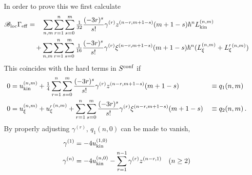 \documentclass[a4paper,12pt]{article}
\newcommand{\Bl}{{\mathscr B}_{\rm loc}}
\def\quar{{\textstyle \frac{1}{4}}}
\newcommand{\Geff}{\Gamma_{\rm eff}}
\newcommand{\Lkin}{L_{\rm kin}}
\newcommand{\Lxi}{L_{\xi}}
\newcommand{\Lxib}{L_{\xi}'{}}
\newcommand{\ukin}{u_{\rm kin}}
\newcommand{\uxi}{u_{\xi}}
\newcommand{\uxib}{{u_{\xi}'}}
\newcommand{\tfr}[2]{{\textstyle \frac{#1}{#2}}}
\begin{document}
In order to prove this we first calculate
\begin{align}
\Bl \Geff &= \phantom{+}\sum_{n,m} \sum_{r=1}^n \sum_{s=0}^m \tfr{1}{32}
\frac{(-3r)^s}{s!}\gamma^{(r)} z^{(n-r, m+1-s)} (m+1-s) \hbar^n \Lkin^{(n,m)} \nonumber \\
&\quad + \sum_{n,m} \sum_{r=1}^n \sum_{s=0}^m \tfr{1}{16} \frac{(-3r)^s}{s!}\gamma^{(r)}
\xi^{(n-r, m+1-s)} (m+1-s) \hbar^n (\Lxi^{(n,m)} + \Lxib^{(n,m)})
\end{align}
This coincides with the hard terms in $S^{\rm conf}$ if
\begin{align}
0  &= \ukin^{(n,m)} + \quar \sum_{r=1}^n \sum_{s=0}^m \frac{(-3r)^s}{s!}\gamma^{(r)} z^{(n-r,
  m+1-s)} (m+1-s) & &\equiv q_1(n,m) \label{CSeq1}\\
0 &=\uxi^{(n,m)} + \uxib^{(n,m)} + \sum_{r=1}^n \sum_{s=0}^m
  \frac{(-3r)^s}{s!}\gamma^{(r)}\xi^{(n-r,  m+1-s)} (m+1-s)  && \equiv q_2(n,m)  \,.
  \label{CSeq2}
\end{align}
By properly adjusting $\gamma^{(r)}$, $q_1(n,0)$ can be made to vanish,
 \begin{align}
 \gamma^{(1)}&= -4 \ukin^{(1,0)} \\
 \gamma^{(n)} &= -4\ukin^{(n,0)} -\sum_{r=1}^{n-1} \gamma^{(r)}
 z^{(n-r,1)} & (n\ge 2)
 \end{align}
\end{document}
